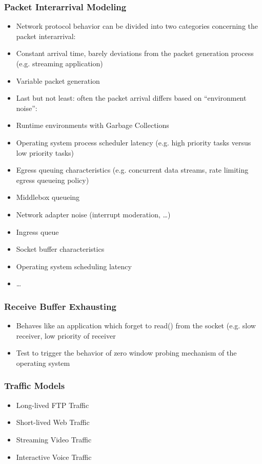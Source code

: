 \documentclass[xcolor=pdftex,dvipsnames,table]{beamer}
\begin{document}
\begin{frame}
\frametitle{Packet Interarrival Modeling}
\begin{itemize}
	\item Network protocol behavior can be divided into two categories concerning the packet interarrival:
	\bi
		\item Constant arrival time, barely deviations from the packet generation process (e.g. streaming application)
		\item Variable packet generation
	\ei
	\item Last but not least: often the packet arrival differs based on ``environment noise'':
	\bi
		\item Runtime environments with Garbage Collections
		\item Operating system process scheduler latency (e.g. high priority tasks versus low priority tasks)
		\item Egress queuing characteristics (e.g. concurrent data streams, rate limiting egress queueing policy)
		\item Middlebox queueing
		\item Network adapter noise (interrupt moderation, \dots)
		\item Ingress queue
		\item Socket buffer characteristics
		\item Operating system scheduling latency
		\item \dots
	\ei
\end{itemize}
\end{frame}



\begin{frame}
\frametitle{Receive Buffer Exhausting}
\begin{itemize}
	\item Behaves like an application which forget to read() from the socket (e.g. slow receiver, low priority of receiver
	\item Test to trigger the behavior of zero window probing mechanism of the operating system
\end{itemize}
\end{frame}


\begin{frame}
\frametitle{Traffic Models}
\begin{itemize}
	\item Long-lived FTP Traffic
	\item Short-lived Web Traffic
	\item Streaming Video Traffic
	\item Interactive Voice Traffic
\end{itemize}
\end{frame}
\end{document}
